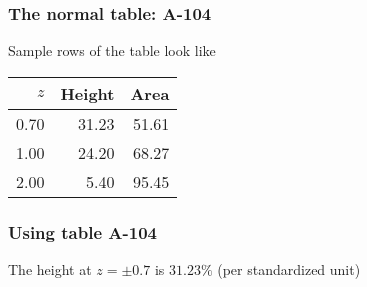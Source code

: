 \documentclass[handout]{beamer}
\begin{document}

   \begin{frame} \frametitle{The normal table: A-104}

   \begin{block}
   {Sample rows of the table look like}
   \begin{tabular}{rrr}
   $z$ & Height & Area \\ \hline
   0.70 & 31.23 & 51.61 \\
   1.00 & 24.20 & 68.27 \\
   2.00 & 5.40 & 95.45 \\
   \end{tabular}
   \end{block}
   \end{frame}



   \begin{frame}
   \frametitle{Using table A-104}
   \begin{center}
   \end{center}
   The height at  $z= \pm 0.7$ is $31.23\%$ (per standardized unit)
   \end{frame}

\end{document}
